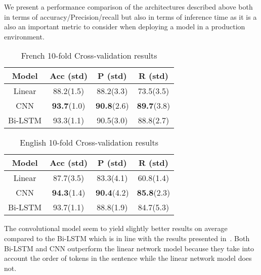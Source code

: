 \documentclass[11pt,a4paper]{article}
\begin{document}
We present a performance comparison of the architectures described above both in terms of accuracy/Precision/recall but also in terms of inference time as it is a also an important metric to consider when deploying a model in a production environment.

\begin{table}[h!]
    \centering
    \begin{tabular}{c|c|c|c}
         \textbf{Model}& \textbf{Acc (std)}&\textbf{P (std)} & \textbf{R (std) }\\
         \hline
         Linear&88.2(1.5)&88.2(3.3)&73.5(3.5)\\
         CNN&\textbf{93.7}(1.0)&\textbf{90.8}(2.6)&\textbf{89.7}(3.8)\\
         Bi-LSTM&93.3(1.1)&90.5(3.0)&88.8(2.7)\\
         \hline
    \end{tabular}
    \caption{French 10-fold Cross-validation results}
    \label{tab:results-cv-fr}
\end{table}



\begin{table}[h!]
    \centering
    \begin{tabular}{c|c|c|c}
         \textbf{Model}& \textbf{Acc (std)}&\textbf{P (std)} & \textbf{R (std) }\\
         \hline
         Linear&87.7(3.5)&83.3(4.1)&60.8(1.4)\\
         CNN&\textbf{94.3}(1.4)&\textbf{90.4}(4.2)&\textbf{85.8}(2.3)\\
         Bi-LSTM&93.7(1.1)&88.8(1.9)&84.7(5.3)\\
         \hline
    \end{tabular}
    \caption{English 10-fold Cross-validation results}
    \label{tab:results-cv-en}
\end{table}

The convolutional model seem to yield slightly better results on average compared to the Bi-LSTM which is in line with the results presented in~\cite{guggilla2016cnn}. Both Bi-LSTM and CNN outperform the linear network model because they take into account the order of tokens in the sentence while the linear network model does not.

\end{document}
